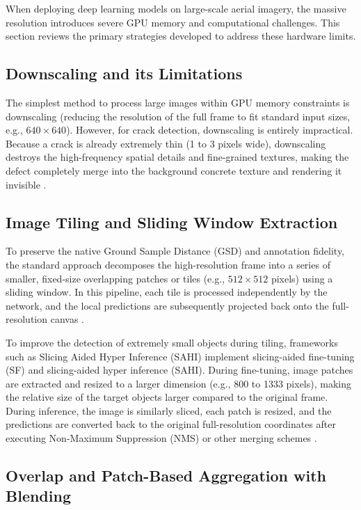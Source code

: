 \hs When deploying deep learning models on large-scale aerial imagery, the massive resolution introduces severe GPU memory and computational challenges. This section reviews the primary strategies developed to address these hardware limits.

\subsection{Downscaling and its Limitations}

\hs The simplest method to process large images within GPU memory constraints is downscaling (reducing the resolution of the full frame to fit standard input sizes, e.g., $640 \times 640$). However, for crack detection, downscaling is entirely impractical. Because a crack is already extremely thin (1 to 3 pixels wide), downscaling destroys the high-frequency spatial details and fine-grained textures, making the defect completely merge into the background concrete texture and rendering it invisible \cite{akyon-2022}.

\subsection{Image Tiling and Sliding Window Extraction}

\hs To preserve the native Ground Sample Distance (GSD) and annotation fidelity, the standard approach decomposes the high-resolution frame into a series of smaller, fixed-size overlapping patches or tiles (e.g., $512 \times 512$ pixels) using a sliding window. In this pipeline, each tile is processed independently by the network, and the local predictions are subsequently projected back onto the full-resolution canvas \cite{akyon-2022}.

\hs To improve the detection of extremely small objects during tiling, frameworks such as Slicing Aided Hyper Inference (SAHI) implement slicing-aided fine-tuning (SF) and slicing-aided hyper inference (SAHI). During fine-tuning, image patches are extracted and resized to a larger dimension (e.g., 800 to 1333 pixels), making the relative size of the target objects larger compared to the original frame. During inference, the image is similarly sliced, each patch is resized, and the predictions are converted back to the original full-resolution coordinates after executing Non-Maximum Suppression (NMS) or other merging schemes \cite{akyon-2022}.

\subsection{Overlap and Patch-Based Aggregation with Blending}

